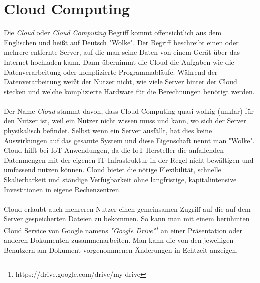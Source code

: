 \section{Cloud Computing}
\label{sec:appendix:cloud}
Die \textit{Cloud} oder \textit{Cloud Computing} Begriff kommt offensichtlich aus dem Englischen und heißt auf Deutsch "Wolke". Der Begriff beschreibt einen oder mehrere entfernte Server, auf die man seine Daten von einem Gerät über das Internet hochladen kann. Dann übernimmt die Cloud die Aufgaben wie die Datenverarbeitung oder komplizierte Programmabläufe. Während der Datenverarbeitung weißt der Nutzer nicht, wie viele Server hinter der Cloud stecken und welche komplizierte Hardware für die Berechnungen benötigt werden.\\\\
Der Name \textit{Cloud} stammt davon, dass Cloud Computing quasi wolkig (unklar) für den Nutzer ist, weil ein Nutzer nicht wissen muss und kann, wo sich der Server physikalisch befindet. Selbst wenn ein Server ausfällt, hat dies keine Auswirkungen auf das gesamte System und diese Eigenschaft nennt man "Wolke". Cloud hilft bei IoT-Anwendungen, da die IoT-Hersteller die anfallenden Datenmengen mit der eigenen IT-Infrastruktur in der Regel nicht bewältigen und umfassend nutzen können. Cloud bietet die nötige Flexibilität, schnelle Skalierbarkeit und ständige Verfügbarkeit ohne langfristige, kapitalintensive Investitionen in eigene Rechenzentren.\\\\
Cloud erlaubt auch mehreren Nutzer einen gemeinsamen Zugriff auf die auf dem Server gespeicherten Dateien zu bekommen. So kann man mit einem berühmten Cloud Service von Google namens \textit{"Google Drive"\footnote{https://drive.google.com/drive/my-drive}} an einer Präsentation oder anderen Dokumenten zusammenarbeiten. Man kann die von den jeweiligen Benutzern am Dokument vorgenommenen Änderungen in Echtzeit anzeigen.

